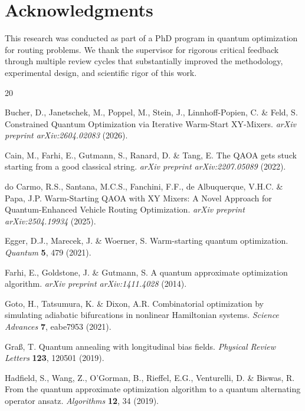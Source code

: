\documentclass[11pt,a4paper]{article}
\theoremstyle{definition}
\begin{document}
\section*{Acknowledgments}

This research was conducted as part of a PhD program in quantum optimization for routing problems. We thank the supervisor for rigorous critical feedback through multiple review cycles that substantially improved the methodology, experimental design, and scientific rigor of this work.


\begin{thebibliography}{20}

Bucher, D., Janetschek, M., Poppel, M., Stein, J., Linnhoff-Popien, C. \& Feld, S.
Constrained Quantum Optimization via Iterative Warm-Start XY-Mixers.
\emph{arXiv preprint arXiv:2604.02083} (2026).

Cain, M., Farhi, E., Gutmann, S., Ranard, D. \& Tang, E.
The QAOA gets stuck starting from a good classical string.
\emph{arXiv preprint arXiv:2207.05089} (2022).

do Carmo, R.S., Santana, M.C.S., Fanchini, F.F., de Albuquerque, V.H.C. \& Papa, J.P.
Warm-Starting QAOA with XY Mixers: A Novel Approach for Quantum-Enhanced Vehicle Routing Optimization.
\emph{arXiv preprint arXiv:2504.19934} (2025).

Egger, D.J., Marecek, J. \& Woerner, S.
Warm-starting quantum optimization.
\emph{Quantum} \textbf{5}, 479 (2021).

Farhi, E., Goldstone, J. \& Gutmann, S.
A quantum approximate optimization algorithm.
\emph{arXiv preprint arXiv:1411.4028} (2014).

Goto, H., Tatsumura, K. \& Dixon, A.R.
Combinatorial optimization by simulating adiabatic bifurcations in nonlinear Hamiltonian systems.
\emph{Science Advances} \textbf{7}, eabe7953 (2021).

Gra{\ss}, T.
Quantum annealing with longitudinal bias fields.
\emph{Physical Review Letters} \textbf{123}, 120501 (2019).

Hadfield, S., Wang, Z., O'Gorman, B., Rieffel, E.G., Venturelli, D. \& Biswas, R.
From the quantum approximate optimization algorithm to a quantum alternating operator ansatz.
\emph{Algorithms} \textbf{12}, 34 (2019).


\end{thebibliography}
\end{document}

